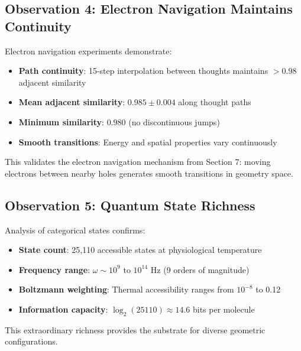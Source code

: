 \subsection{Observation 4: Electron Navigation Maintains Continuity}

\begin{observation}
\label{obs:continuity}
Electron navigation experiments demonstrate:
\begin{itemize}
\item \textbf{Path continuity}: 15-step interpolation between thoughts maintains $> 0.98$ adjacent similarity
\item \textbf{Mean adjacent similarity}: $0.985 \pm 0.004$ along thought paths
\item \textbf{Minimum similarity}: $0.980$ (no discontinuous jumps)
\item \textbf{Smooth transitions}: Energy and spatial properties vary continuously
\end{itemize}
\end{observation}

This validates the electron navigation mechanism from Section 7: moving electrons between nearby holes generates smooth transitions in geometry space.

\subsection{Observation 5: Quantum State Richness}



\begin{observation}
\label{obs:quantum}
Analysis of  categorical states confirms:
\begin{itemize}
\item \textbf{State count}: 25,110 accessible states at physiological temperature
\item \textbf{Frequency range}: $\omega \sim 10^9$ to $10^{14}$ Hz (9 orders of magnitude)
\item \textbf{Boltzmann weighting}: Thermal accessibility ranges from $10^{-8}$ to 0.12
\item \textbf{Information capacity}: $\log_2(25110) \approx 14.6$ bits per molecule
\end{itemize}
\end{observation}

This extraordinary richness provides the substrate for diverse geometric configurations.

